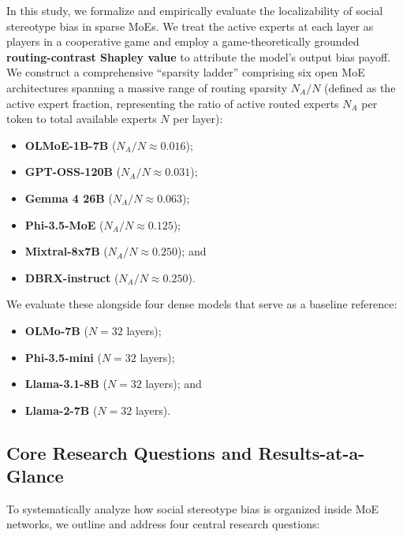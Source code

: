 \documentclass[11pt,a4paper]{article}
\begin{document}
In this study, we formalize and empirically evaluate the localizability of social stereotype bias in sparse MoEs. We treat the active experts at each layer as players in a cooperative game and employ a game-theoretically grounded \textbf{routing-contrast Shapley value} to attribute the model's output bias payoff. We construct a comprehensive ``sparsity ladder'' comprising six open MoE architectures spanning a massive range of routing sparsity $N_A/N$ (defined as the active expert fraction, representing the ratio of active routed experts $N_A$ per token to total available experts $N$ per layer):
\begin{itemize}
    \item \textbf{OLMoE-1B-7B} ($N_A/N \approx 0.016$);
    \item \textbf{GPT-OSS-120B} ($N_A/N \approx 0.031$);
    \item \textbf{Gemma 4 26B} ($N_A/N \approx 0.063$);
    \item \textbf{Phi-3.5-MoE} ($N_A/N \approx 0.125$);
    \item \textbf{Mixtral-8x7B} ($N_A/N \approx 0.250$); and
    \item \textbf{DBRX-instruct} ($N_A/N \approx 0.250$).
\end{itemize}
We evaluate these alongside four dense models that serve as a baseline reference:
\begin{itemize}
    \item \textbf{OLMo-7B} ($N = 32$ layers);
    \item \textbf{Phi-3.5-mini} ($N = 32$ layers);
    \item \textbf{Llama-3.1-8B} ($N = 32$ layers); and
    \item \textbf{Llama-2-7B} ($N = 32$ layers).
\end{itemize}

\subsection{Core Research Questions and Results-at-a-Glance}
To systematically analyze how social stereotype bias is organized inside MoE networks, we outline and address four central research questions:
\end{document}
